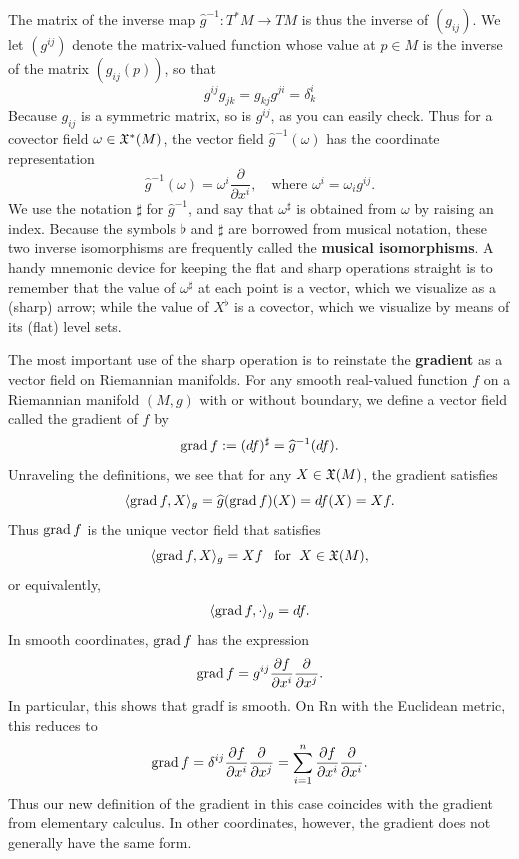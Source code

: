 The matrix of the inverse map $\widehat{g}^{-1}:T^*M\to TM$ is thus the inverse 
of $(g_{ij})$. We let $(g^{ij})$ denote the matrix-valued 
function whose value at $p\in M$ is the inverse of the matrix $(g_{ij}(p))$, so 
that
\[g^{ij}g_{jk}=g_{kj}g^{ji}=\delta^i_k\]
Because $g_{ij}$ is a symmetric matrix, so is $g^{ij}$, as you can easily check. 
Thus for a covector field $\omega\in\mathfrak{X}^*(M)$, the vector field 
$\widehat{g}^{-1}(\omega)$ has the coordinate representation
\[\widehat{g}^{-1}(\omega)=\omega^i\frac{\partial}{\partial x^i},\quad\text{where }\omega^i=\omega_ig^{ij}.\]
We use the notation $\sharp$ for $\widehat{g}^{-1}$, and say that $\omega^\sharp$ 
is obtained from $\omega$ by raising an index. Because the symbols $\flat$ and 
$\sharp$ are borrowed from musical notation, these two inverse isomorphisms are 
frequently called the \textbf{musical isomorphisms}. A handy mnemonic device for 
keeping the flat and sharp operations straight is to remember that the value of 
$\omega^\sharp$ at each point is a vector, which we visualize as a (sharp) arrow; 
while the value of $X^\flat$ is a covector, which we visualize by means of its 
(flat) level sets.\par
The most important use of the sharp operation is to reinstate the \textbf{gradient} as a 
vector field on Riemannian manifolds. For any smooth real-valued function $f$ on 
a Riemannian manifold $(M,g)$ with or without boundary, we define a vector field 
called the gradient of $f$ by
\[\mathrm{grad}\, f:=(df)^\sharp=\widehat{g}^{-1}(df).\]
Unraveling the definitions, we see that for any $X\in\mathfrak{X}(M)$, the gradient satisfies
\[\langle\mathrm{grad}\, f,X\rangle_g=\widehat{g}(\mathrm{grad}\, f)(X)=df(X)=Xf.\]
Thus $\mathrm{grad}\, f$ is the unique vector field that satisfies
\[\langle\mathrm{grad}\, f,X\rangle_g=Xf\hspace{8pt}\text{for}\hspace{6pt} X\in\mathfrak{X}(M),\]
or equivalently,
\begin{align}\label{Riemann grad def}
\langle\mathrm{grad}\, f,\cdot\rangle_g=df.
\end{align}
In smooth coordinates, $\mathrm{grad}\, f$ has the expression
\[\mathrm{grad}\, f=g^{ij}\frac{\partial f}{\partial x^i}\frac{\partial}{\partial x^j}.\]
In particular, this shows that gradf is smooth. On Rn with the Euclidean metric,
this reduces to
\[\mathrm{grad}\, f=\delta^{ij}\frac{\partial f}{\partial x^i}\frac{\partial}{\partial x^j}=\sum_{i=1}^{n}\frac{\partial f}{\partial x^i}\frac{\partial}{\partial x^i}.\]
Thus our new definition of the gradient in this case coincides with the gradient from
elementary calculus. In other coordinates, however, the gradient does not generally
have the same form.
